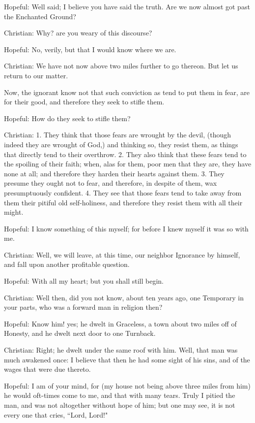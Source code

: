 Hopeful: Well said; I believe you have said the truth. Are we now almost got past the Enchanted Ground?

Christian: Why? are you weary of this discourse?

Hopeful: No, verily, but that I would know where we are.

Christian: We have not now above two miles further to go thereon. But let us return to our matter.

Now, the ignorant know not that such conviction as tend to put them in fear, are for their good, and therefore they seek to stifle them.

Hopeful: How do they seek to stifle them?

Christian: 1. They think that those fears are wrought by the devil, (though indeed they are wrought of God,) and thinking so, they resist them, as things that directly tend to their overthrow. 2. They also think that these fears tend to the spoiling of their faith; when, alas for them, poor men that they are, they have none at all; and therefore they harden their hearts against them. 3. They presume they ought not to fear, and therefore, in despite of them, wax presumptuously confident. 4. They see that those fears tend to take away from them their pitiful old self-holiness, and therefore they resist them with all their might.

Hopeful: I know something of this myself; for before I knew myself it was so with me.

Christian: Well, we will leave, at this time, our neighbor Ignorance by himself, and fall upon another profitable question.

Hopeful: With all my heart; but you shall still begin.

Christian: Well then, did you not know, about ten years ago, one Temporary in your parts, who was a forward man in religion then?

Hopeful: Know him! yes; he dwelt in Graceless, a town about two miles off of Honesty, and he dwelt next door to one Turnback.

Christian: Right; he dwelt under the same roof with him. Well, that man was much awakened once: I believe that then he had some sight of his sins, and of the wages that were due thereto.

Hopeful: I am of your mind, for (my house not being above three miles from him) he would oft-times come to me, and that with many tears. Truly I pitied the man, and was not altogether without hope of him; but one may see, it is not every one that cries, ``Lord, Lord!"


